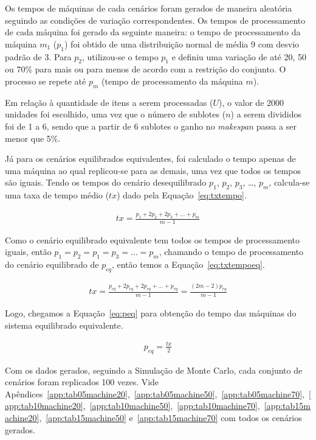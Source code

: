     Os tempos de máquinas de cada cenários foram gerados de maneira aleatória seguindo as condições de variação correspondentes. Os tempos de processamento de cada máquina foi gerado da seguinte maneira: o tempo de processamento da máquina $m_1$ ($p_1$) foi obtido de uma distribuição normal de média 9 com desvio padrão de 3. Para $p_2$, utilizou-se o tempo $p_1$ e definiu uma variação de até 20, 50 ou 70\% para mais ou para menos de acordo com a restrição do conjunto. O processo se repete até $p_m$ (tempo de processamento da máquina $m$).
    
    Em relação à quantidade de itens a serem processadas ($U$), o valor de 2000 unidades foi escolhido, uma vez que o número de sublotes ($n$) a serem divididos foi de 1 a 6, sendo que a partir de 6 sublotes o ganho no \textit{makespan} passa a ser menor que 5\%. 
    
    Já para os cenários equilibrados equivalentes, foi calculado o tempo apenas de uma máquina ao qual replicou-se para as demais, uma vez que todos os tempos são iguais. Tendo os tempos do cenário desequilibrado $p_1$, $p_2$, $p_3$, \ldots, $p_m$, calcula-se uma taxa de tempo médio ($tx$) dado pela Equação~\ref{eq:txtempo}.
    
    \begin{eqnarray}
        tx = \frac{p_1+2p_2+2p_3+\ldots+p_m}{m-1}
        \label{eq:txtempo}
    \end{eqnarray}
    
    Como o cenário equilibrado equivalente tem todos os tempos de processamento iguais, então $p_1=p_2=p_1=p_3=\ldots=p_m$, chamando o tempo de processamento do cenário equilibrado de $p_{eq}$, então temos a Equação~\ref{eq:txtempoeq}.
    
    \begin{eqnarray}
        tx = \frac{p_{eq}+2p_{eq}+2p_{eq}+\ldots+p_{eq}}{m-1}
           = \frac{(2m-2)p_{eq}}{m-1}
        \label{eq:txtempoeq}
    \end{eqnarray}
    
    Logo, chegamos a Equação~\ref{eq:peq} para obtenção do tempo das máquinas do sistema equilibrado equivalente.
    
    \begin{eqnarray}
        p_{eq}=\frac{tx}{2}
        \label{eq:peq}
    \end{eqnarray}
    
    Com os dados gerados, seguindo a Simulação de Monte Carlo, cada conjunto de cenários foram replicados 100 vezes. Vide Apêndices~\ref{app:tab05machine20},~\ref{app:tab05machine50},~\ref{app:tab05machine70},~\ref{app:tab10machine20},~\ref{app:tab10machine50},~\ref{app:tab10machine70},~\ref{app:tab15machine20},~\ref{app:tab15machine50} e~\ref{app:tab15machine70} com todos os cenários gerados.
    
